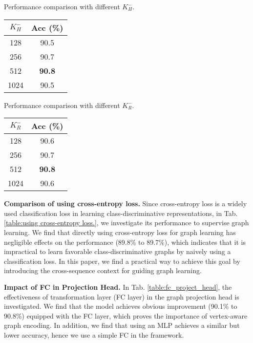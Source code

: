 \documentclass{article} \usepackage{iclr2023_conference,times}
\begin{document}
\begin{minipage}{\textwidth}
\begin{minipage}[t]{0.45\textwidth}
\centering
\makeatletter{}
\setlength\tabcolsep{2.5pt}
\scriptsize
\caption{Performance comparison with different $K_H^-$.}
    \begin{tabular}{c||c}
\rowcolor{gray!30} $K_H^-$ & Acc (\%) \\
       \hline \hline
        128 & 90.5 \\
        256 & 90.7 \\
        512 & \textbf{90.8} \\
        1024 & 90.5 \\ \hline
    \end{tabular}
    \label{tab:K_H_minus.}
\end{minipage}
\hspace{3mm}
\begin{minipage}[t]{0.45\textwidth}
\centering
\makeatletter{}
\setlength\tabcolsep{2.5pt}
\scriptsize
\caption{Performance comparison with different $K_R^-$.}
    \begin{tabular}{c||c}
\rowcolor{gray!30} $K_R^-$ & Acc (\%) \\
       \hline \hline
        128 & 90.6 \\
        256 & 90.7 \\
        512 & \textbf{90.8} \\
        1024 & 90.6 \\ \hline
    \end{tabular}
    \label{tab:K_R_minus.}
\end{minipage}
\end{minipage}


\textbf{Comparison of using cross-entropy loss.} Since cross-entropy loss is a widely used classification loss in learning class-discriminative representations, in Tab. \ref{table:using cross-entropy loss.}, we investigate its performance to supervise graph learning. We find that directly using cross-entropy loss for graph learning has negligible effects on the performance (89.8\% to 89.7\%), which indicates that it is impractical to learn favorable class-discriminative graphs by naively using a classification loss. In this paper, we find a practical way to achieve this goal by introducing the cross-sequence context for guiding graph learning.

\noindent \textbf{Impact of FC in Projection Head.} In Tab. \ref{table:fc_project_head}, the effectiveness of transformation layer (FC layer) in the graph projection head is investigated. We find that the model achieves obvious improvement (90.1\% to 90.8\%) equipped with the FC layer, which proves the importance of vertex-aware graph encoding. In addition, we find that using an MLP achieves a similar but lower accuracy, hence we use a simple FC in the framework.
\end{document}
